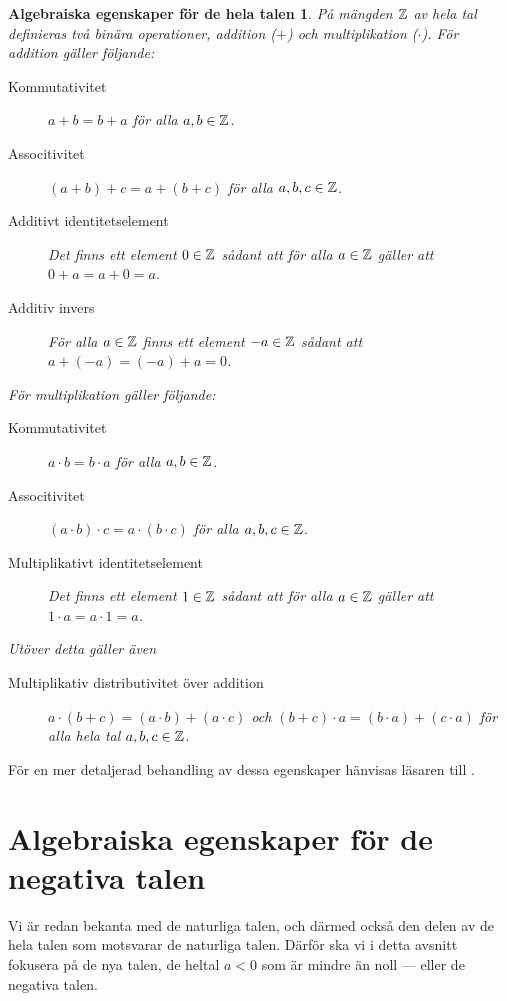 \theoremstyle{plain}
\newtheorem*{AlgebraicPropertiesIntegers}{Algebraiska egenskaper för de hela
  talen}
\begin{AlgebraicPropertiesIntegers}\label{def:HeltalenEgenskaper}
  På mängden \(\mathbb{Z}\) av hela tal definieras två binära operationer,
  addition (\(+\)) och multiplikation (\(\cdot\)).
  För addition gäller följande:
  \begin{description}
    \item[Kommutativitet] \(a+b=b+a\) för alla \(a,b\in\mathbb{Z}\).
    \item[Associtivitet] \((a+b)+c=a+(b+c)\) för alla \(a,b,c\in\mathbb{Z}\).
    \item[Additivt identitetselement] Det finns ett element \(0\in\mathbb{Z}\)
      sådant att för alla \(a\in\mathbb{Z}\) gäller att \(0+a = a+0 = a\).
    \item[Additiv invers] För alla \(a\in\mathbb{Z}\) finns ett element \(-a\in\mathbb{Z}\)
      sådant att \(a + (-a) = (-a) + a = 0\).
  \end{description}
  För multiplikation gäller följande:
  \begin{description}
    \item[Kommutativitet] \(a \cdot b=b \cdot a\) för alla \(a,b\in\mathbb{Z}\).
    \item[Associtivitet] \((a \cdot b) \cdot c=a \cdot (b \cdot c)\) för
      alla \(a,b,c\in\mathbb{Z}\).
    \item[Multiplikativt identitetselement] Det finns ett element
      \(1\in\mathbb{Z}\) sådant att för alla \(a\in\mathbb{Z}\) gäller att
      \(1 \cdot a = a \cdot 1 = a\).
  \end{description}
  Utöver detta gäller även
  \begin{description}
    \item[Multiplikativ distributivitet över addition]
      \(a \cdot (b+c) = (a \cdot b) + (a \cdot c)\) och
      \((b+c) \cdot a = (b \cdot a) + (c \cdot a)\) för alla hela tal
      \(a,b,c\in\mathbb{Z}\).
  \end{description}
\end{AlgebraicPropertiesIntegers}

För en mer detaljerad behandling av dessa egenskaper hänvisas läsaren till 
\cite{Bartle2000itr,Grillet2007aa}.



\section{Algebraiska egenskaper för de negativa talen}
Vi är redan bekanta med de naturliga talen, och därmed också den
delen av de hela talen som motsvarar de naturliga talen.
Därför ska vi i detta avsnitt fokusera på de nya talen, de heltal \(a<0\) som
är mindre än noll --- eller de negativa talen.

